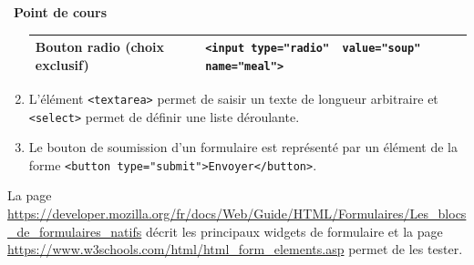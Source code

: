 \documentclass[
  11pt,
]{article}
\newcommand{\passthrough}[1]{#1}
\newcounter{cours}
\newenvironment{cours}[1]
{\par \medskip   \addtocounter{cours}{1} \noindent  
\begin{bclogo}[arrondi =0.1,  ombre = true, barre=none, logo=\bcbook, marge=4]{~\textbf{Point de cours} \textbf{\thecours} {\itshape #1} }  \par}
{
\end{bclogo}
 \par \bigskip }
\begin{document}
\begin{cours}{}
\begin{enumerate}
\begin{longtable}[]{@{}ll@{}}
\begin{minipage}[t]{0.47\columnwidth}
  Bouton radio (choix exclusif)\strut
  \end{minipage} & \begin{minipage}[t]{0.47\columnwidth}\raggedright
  \passthrough{\lstinline!<input type="radio"  value="soup"  name="meal">!}\strut
  \end{minipage}\tabularnewline
  \bottomrule
  \end{longtable}
\item
  L'élément \passthrough{\lstinline!<textarea>!} permet de saisir un
  texte de longueur arbitraire et \passthrough{\lstinline!<select>!}
  permet de définir une liste déroulante.
\item
  Le bouton de soumission d'un formulaire est représenté par un élément
  de la forme
  \passthrough{\lstinline!<button type="submit">Envoyer</button>!}.
\end{enumerate}

La page
\url{https://developer.mozilla.org/fr/docs/Web/Guide/HTML/Formulaires/Les_blocs_de_formulaires_natifs}
décrit les principaux widgets de formulaire et la page
\url{https://www.w3schools.com/html/html_form_elements.asp} permet de
les tester.

\end{cours}
\end{document}
